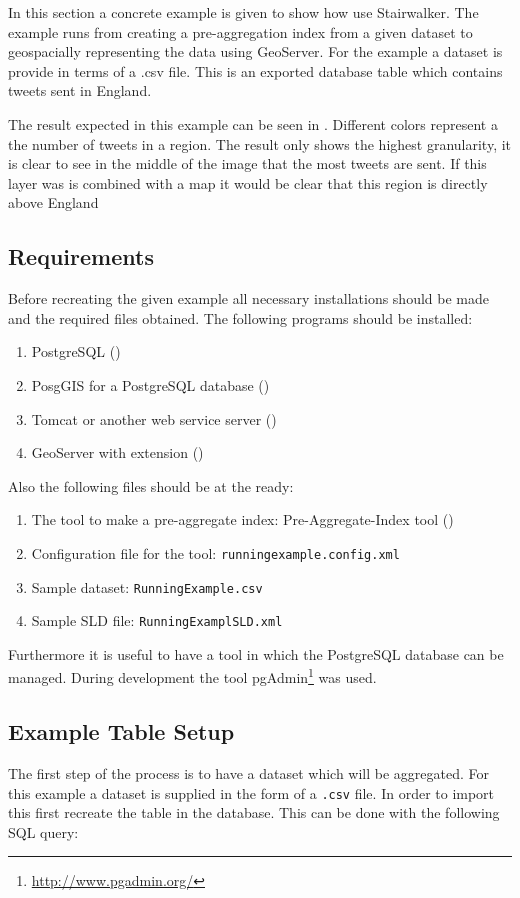 In this section a concrete example is given to show how use Stairwalker. The example runs from creating a pre-aggregation index from a given dataset to geospacially representing the data using GeoServer. For the example a dataset is provide in terms of a .csv file. This is an exported database table which contains tweets sent in England.

The result expected in this example can be seen in . Different colors represent a the number of tweets in a region. The result only shows the highest granularity, it is clear to see in the middle of the image that the most tweets are sent. If this layer was is combined with a map it would be clear that this region is directly above England

\subsection{Requirements}
Before recreating the given example all necessary installations should be made and the required files obtained. The following programs should be installed:
\begin{enumerate}
	\item PostgreSQL ()
	\item PosgGIS for a PostgreSQL database ()
	\item Tomcat or another web service server ()
	\item GeoServer with extension ()
\end{enumerate}
Also the following files should be at the ready:
\begin{enumerate}
	\item The tool to make a pre-aggregate index: Pre-Aggregate-Index tool ()
	\item Configuration file for the tool: \lstinline|runningexample.config.xml|
	\item Sample dataset: \lstinline|RunningExample.csv|
	\item Sample SLD file: \lstinline|RunningExamplSLD.xml|
\end{enumerate}
Furthermore it is useful to have a tool in which the PostgreSQL database can be managed. During development the tool pgAdmin\footnote{\url{http://www.pgadmin.org/}} was used.

\pagebreak
\subsection{Example Table Setup}
The first step of the process is to have a dataset which will be aggregated. For this example a dataset is supplied in the form of a \lstinline|.csv| file. In order to import this first recreate the table in the database. This can be done with the following SQL query:
